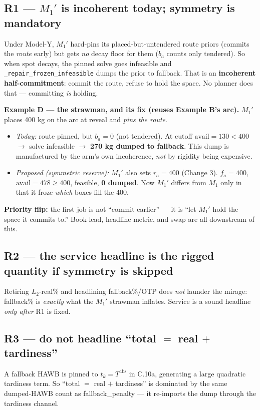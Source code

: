 \documentclass[11pt]{article}
\newcommand{\resv}{r}
\newcommand{\avail}{\mathrm{avail}}
\newcommand{\code}[1]{\texttt{#1}}
\begin{document}
\subsection{R1 --- $M_1'$ is incoherent today; symmetry is mandatory}
Under Model-Y, $M_1'$ hard-pins its placed-but-untendered route priors (commits the \emph{route} early)
but gets \emph{no} decay floor for them ($b_a$ counts only tendered). So when spot decays, the pinned solve
goes infeasible and \code{\_repair\_frozen\_infeasible} dumps the prior to fallback. That is an
\textbf{incoherent half-commitment}: commit the route, refuse to hold the space. No planner does that ---
committing \emph{is} holding.

\begin{mdframed}[backgroundcolor=red!5,linewidth=0.4pt]
\textbf{Example D --- the strawman, and its fix (reuses Example B's arc).} $M_1'$ places 400 kg on the arc
at reveal and \emph{pins the route}.
\begin{itemize}[leftmargin=1.4em,itemsep=0pt]
\item \emph{Today:} route pinned, but $b_a=0$ (not tendered). At cutoff $\avail=130<400$ $\to$ solve
infeasible $\to$ \textbf{270 kg dumped to fallback}. This dump is manufactured by the arm's own
incoherence, \emph{not} by rigidity being expensive.
\item \emph{Proposed (symmetric reserve):} $M_1'$ also sets $\resv_a=400$ (Change 3). $f_a=400$,
$\avail=478\ge400$, feasible, \textbf{0 dumped}. Now $M_1'$ differs from $M_1$ only in that it froze
\emph{which} boxes fill the 400.
\end{itemize}
\textbf{Priority flip:} the first job is not ``commit earlier'' --- it is ``let $M_1'$ hold the space it
commits to.'' Book-lead, headline metric, and swap are all downstream of this.
\end{mdframed}

\subsection{R2 --- the service headline is the rigged quantity if symmetry is skipped}
Retiring $L_2$-real\% and headlining fallback\%/OTP does \emph{not} launder the mirage: fallback\% is
\emph{exactly} what the $M_1'$ strawman inflates. Service is a sound headline \emph{only after} R1 is fixed.

\subsection{R3 --- do not headline ``total $=$ real $+$ tardiness''}
A fallback HAWB is pinned to $t_k=T^{\mathrm{abs}}$ in C.10a, generating a large quadratic tardiness term.
So ``total $=$ real $+$ tardiness'' is dominated by the same dumped-HAWB count as fallback\_penalty --- it
re-imports the dump through the tardiness channel.
\end{document}
